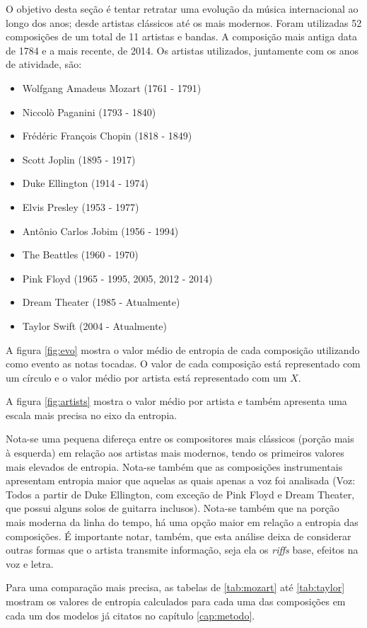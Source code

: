O objetivo desta seção é tentar retratar uma evolução da música internacional ao longo dos anos; desde artistas clássicos até os mais modernos. Foram utilizadas 52 composições de um total de 11 artistas e bandas. A composição mais antiga data de 1784 e a mais recente, de 2014. Os artistas utilizados, juntamente com os anos de atividade, são:

\begin{itemize}
    \item Wolfgang Amadeus Mozart (1761 - 1791) \cite{midiworld}
    \item Niccolò Paganini (1793 - 1840) \cite{midimelody}
    \item Frédéric François Chopin (1818 - 1849) \cite{midiworld}
    \item Scott Joplin (1895 - 1917) \cite{trachtman}
    \item Duke Ellington (1914 - 1974) \cite{midimelody}
    \item Elvis Presley (1953 - 1977) \cite{midiworld}
    \item Antônio Carlos Jobim (1956 - 1994) \cite{wersi}
    \item The Beattles (1960 - 1970) \cite{midiworld}
    \item Pink Floyd (1965 - 1995, 2005, 2012 - 2014) \cite{midiworld}
    \item Dream Theater (1985 - Atualmente) \cite{freemidi}
    \item Taylor Swift (2004 - Atualmente) \cite{freemidi}
\end{itemize}
A figura \ref{fig:evo} mostra o valor médio de entropia de cada composição utilizando como evento as notas tocadas. O valor de cada composição está representado com um círculo e o valor médio por artista está representado com um $X$. 

A figura \ref{fig:artists} mostra o valor médio por artista e também apresenta uma escala mais precisa no eixo da entropia.

Nota-se uma pequena difereça entre os compositores mais clássicos (porção mais à esquerda) em relação aos artistas mais modernos, tendo os primeiros valores mais elevados de entropia. Nota-se também que as composições instrumentais apresentam entropia maior que aquelas as quais apenas a voz foi analisada (Voz: Todos a partir de Duke Ellington, com exceção de Pink Floyd e Dream Theater, que possui alguns solos de guitarra inclusos). Nota-se também que na porção mais moderna da linha do tempo, há uma opção maior em relação a entropia das composições. É importante notar, também, que esta análise deixa de considerar outras formas que o artista transmite informação, seja ela os \textit{riffs} base, efeitos na voz e letra.

Para uma comparação mais precisa, as tabelas de \ref{tab:mozart} até \ref{tab:taylor} mostram os valores de entropia calculados para cada uma das composições em cada um dos modelos já citatos no capítulo \ref{cap:metodo}.
